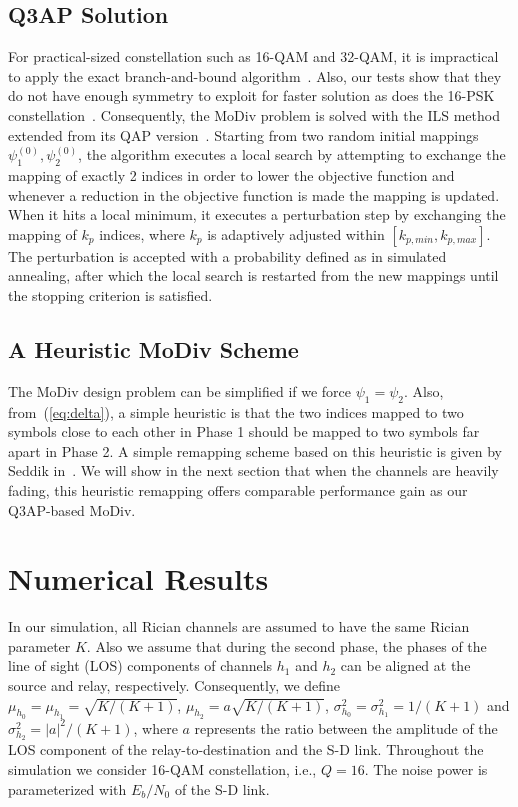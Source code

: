 \documentclass[journal]{IEEEtran}
\begin{document}
\subsection{Q3AP Solution}
For practical-sized constellation such as 16-QAM and 32-QAM, it is impractical
to apply the exact branch-and-bound algorithm~\cite{hahn2008quadratic}. Also,
our tests show that they do not have enough symmetry to exploit for faster
solution as does the 16-PSK constellation~\cite{mittelmann2015solving}.
Consequently, the MoDiv problem is solved with the ILS
method~\cite{hahn2008quadratic} extended from its QAP
version~\cite{stutzle2006iterated}. Starting from two random initial mappings
$\psi_1^{(0)}, \psi_2^{(0)}$, the algorithm executes a local search by
attempting to exchange the mapping of exactly 2 indices in order to lower the
objective function and whenever a reduction in the objective function is made
the mapping is updated. When it hits a local minimum, it executes a perturbation
step by exchanging the mapping of $k_p$ indices, where $k_p$ is adaptively
adjusted within $[k_{p,min}, k_{p,max}]$. The perturbation is accepted with a
probability defined as in simulated annealing, after which the local search is
restarted from the new mappings until the stopping criterion is satisfied.

\subsection{A Heuristic MoDiv Scheme}
\label{sec:heuristic}
The MoDiv design problem can be simplified if we force $\psi_1=\psi_2$. Also,
from~(\ref{eq:delta}), a simple heuristic is that the two indices mapped to two
symbols close to each other in Phase 1 should be mapped to two
symbols far apart in Phase 2. A simple remapping scheme based on this heuristic
is given by Seddik in~\cite{seddik2008trans}. We will show in the next section
that when the channels are heavily fading, this heuristic remapping offers
comparable performance gain as our Q3AP-based MoDiv.

\section{Numerical Results}
\label{sec:simulation}
In our simulation, all Rician channels are assumed to have the same Rician
parameter $K$. Also we assume that during the second phase, the phases of the
line of sight (LOS) components of channels $h_1$ and $h_2$ can be aligned at the
source and relay, respectively.
Consequently, we define $\mu_{h_0} = \mu_{h_1} = \sqrt{K/(K + 1)}$,
$\mu_{h_2}=a\sqrt{K/(K + 1)}$,  $\sigma_{h_0}^2 = \sigma_{h_1}^2 = 1/(K+1)$ and
$\sigma_{h_2}^2 = |a|^2/(K+1)$, where $a$ represents the ratio
between the amplitude of the LOS component of the
relay-to-destination and the S-D link. Throughout the
simulation we consider 16-QAM constellation, i.e.,  $Q=16$. The noise power is
parameterized with $E_b/N_0$ of the S-D link.
\end{document}
